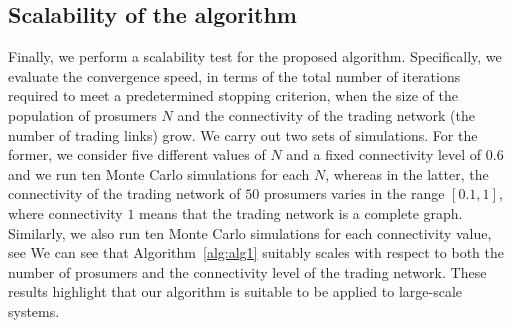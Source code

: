 \documentclass{IEEEtran}  %
\newcommand{\0}{\mathbf{0}}
\newcommand{\1}{\mathbf{1}}
\newcommand{\edit}[1]{\color{blue}{#1}\color{black}}
\begin{document}

\subsection{Scalability of the algorithm}
Finally, we perform a scalability test for the proposed algorithm. Specifically, we evaluate the convergence speed, in terms of the total number of iterations required to meet a predetermined stopping criterion, when the size of the population of prosumers $N$ and the connectivity of the trading network (the number of trading links) grow. We carry out two sets of simulations.
%
For the former, we consider five different values of $N$ and a fixed connectivity level of $0.6$ and we run ten Monte Carlo simulations for each $N$, whereas in the latter, the connectivity of the trading network of $50$ prosumers varies in the range $[0.1,1]$, where connectivity $1$ means that the trading network is a complete graph. Similarly, we also run ten Monte Carlo simulations for each connectivity value, see
\edit{Figures~\ref{fig:simE1}--\ref{fig:simE2}.} We can see that Algorithm~\ref{alg:alg1} suitably scales with respect to both the number of prosumers and the connectivity level of the trading network. These results highlight that our algorithm is suitable to be applied to  large-scale systems. 
\end{document}
